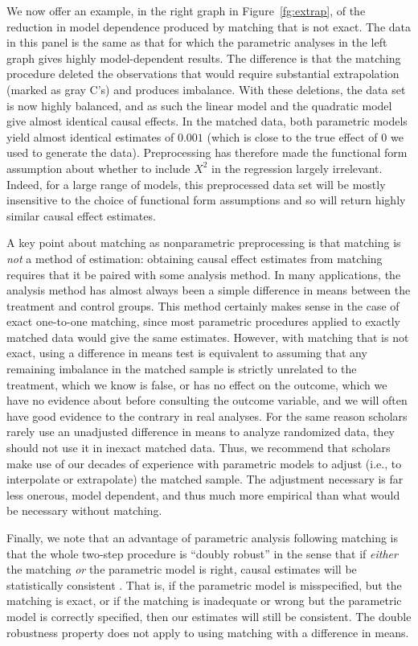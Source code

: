 \documentclass[11pt,titlepage]{article}
\begin{document}
We now offer an example, in the right graph in Figure~\ref{fg:extrap},
of the reduction in model dependence produced by matching that is not
exact.  The data in this panel is the same as that for which the
parametric analyses in the left graph gives highly model-dependent
results.  The difference is that the matching procedure deleted the
observations that would require substantial extrapolation (marked as
gray C's) and produces imbalance.  With these deletions, the data set
is now highly balanced, and as such the linear model and the quadratic
model give almost identical causal effects.  In the matched data, both
parametric models yield almost identical estimates of $0.001$ (which
is close to the true effect of $0$ we used to generate the data).
Preprocessing has therefore made the functional form assumption about
whether to include $X^2$ in the regression largely irrelevant.
Indeed, for a large range of models, this preprocessed data set will
be mostly insensitive to the choice of functional form assumptions and
so will return highly similar causal effect estimates.

A key point about matching as nonparametric preprocessing is that
matching is \emph{not} a method of estimation: obtaining causal effect
estimates from matching requires that it be paired with some analysis
method.  In many applications, the analysis method has almost always
been a simple difference in means between the treatment and control
groups.  This method certainly makes sense in the case of exact
one-to-one matching, since most parametric procedures applied to
exactly matched data would give the same estimates.  However, with
matching that is not exact, using a difference in means test is
equivalent to assuming that any remaining imbalance in the matched
sample is strictly unrelated to the treatment, which we know is false,
or has no effect on the outcome, which we have no evidence about
before consulting the outcome variable, and we will often have good
evidence to the contrary in real analyses.  For the same reason
scholars rarely use an unadjusted difference in means to analyze
randomized data, they should not use it in inexact matched data.
Thus, we recommend that scholars make use of our decades of experience
with parametric models to adjust (i.e., to interpolate or extrapolate)
the matched sample.  The adjustment necessary is far less onerous,
model dependent, and thus much more empirical than what would be
necessary without matching.

Finally, we note that an advantage of parametric analysis following
matching is that the whole two-step procedure is ``doubly robust'' in
the sense that if \emph{either} the matching \emph{or} the parametric
model is right, causal estimates will be statistically consistent
\citep[see][]{RobRot01}.  That is, if the parametric model is
misspecified, but the matching is exact, or if the matching is
inadequate or wrong but the parametric model is correctly specified,
then our estimates will still be consistent.  The double robustness
property does not apply to using matching with a difference in means.
\end{document}
